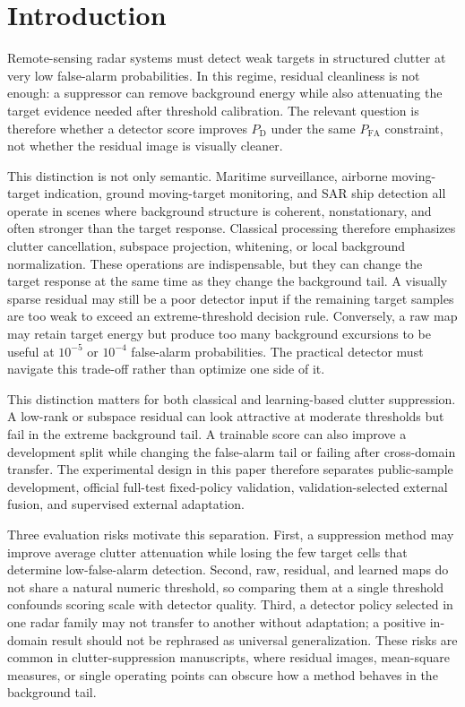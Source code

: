\documentclass[journal]{IEEEtran}
\begin{document}
\section{Introduction}

Remote-sensing radar systems must detect weak targets in structured clutter at very low false-alarm probabilities. In this regime, residual cleanliness is not enough: a suppressor can remove background energy while also attenuating the target evidence needed after threshold calibration. The relevant question is therefore whether a detector score improves $P_{\mathrm{D}}$ under the same $P_{\mathrm{FA}}$ constraint, not whether the residual image is visually cleaner.

This distinction is not only semantic. Maritime surveillance, airborne moving-target indication, ground moving-target monitoring, and SAR ship detection all operate in scenes where background structure is coherent, nonstationary, and often stronger than the target response. Classical processing therefore emphasizes clutter cancellation, subspace projection, whitening, or local background normalization. These operations are indispensable, but they can change the target response at the same time as they change the background tail. A visually sparse residual may still be a poor detector input if the remaining target samples are too weak to exceed an extreme-threshold decision rule. Conversely, a raw map may retain target energy but produce too many background excursions to be useful at $10^{-5}$ or $10^{-4}$ false-alarm probabilities. The practical detector must navigate this trade-off rather than optimize one side of it.

This distinction matters for both classical and learning-based clutter suppression. A low-rank or subspace residual can look attractive at moderate thresholds but fail in the extreme background tail. A trainable score can also improve a development split while changing the false-alarm tail or failing after cross-domain transfer. The experimental design in this paper therefore separates public-sample development, official full-test fixed-policy validation, validation-selected external fusion, and supervised external adaptation.

Three evaluation risks motivate this separation. First, a suppression method may improve average clutter attenuation while losing the few target cells that determine low-false-alarm detection. Second, raw, residual, and learned maps do not share a natural numeric threshold, so comparing them at a single threshold confounds scoring scale with detector quality. Third, a detector policy selected in one radar family may not transfer to another without adaptation; a positive in-domain result should not be rephrased as universal generalization. These risks are common in clutter-suppression manuscripts, where residual images, mean-square measures, or single operating points can obscure how a method behaves in the background tail.
\end{document}
